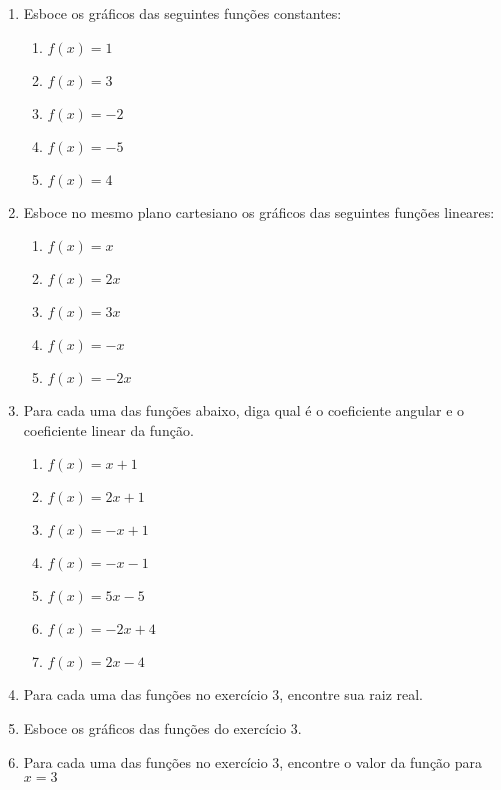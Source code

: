 \documentclass[a4paper]{article}
\begin{document}
\begin{enumerate}

\item Esboce os gráficos das seguintes funções constantes:

  \begin{enumerate}
  \item $f(x) = 1$
  \item $f(x) = 3$
  \item $f(x) = -2$
  \item $f(x) = -5$
  \item $f(x) = 4$
  \end{enumerate}

\item Esboce no mesmo plano cartesiano os gráficos das seguintes
  funções lineares:

  \begin{enumerate}
  \item $f(x) = x$
  \item $f(x) = 2x$
  \item $f(x) = 3x$
  \item $f(x) = -x$
  \item $f(x) = -2x$
  \end{enumerate}

\item Para cada uma das funções abaixo, diga qual é o coeficiente
  angular e o coeficiente linear da função.

  \begin{enumerate}
  \item $f(x) = x+1$
  \item $f(x) = 2x+1$
  \item $f(x) = -x+1$
  \item $f(x) = -x-1$
  \item $f(x) = 5x-5$
  \item $f(x) = -2x +4$
  \item $f(x) = 2x -4$
  \end{enumerate}

\item Para cada uma das funções no exercício 3, encontre sua raiz
  real.

\item Esboce os gráficos das funções do exercício 3.

\item Para cada uma das funções no exercício 3, encontre o valor da
  função para $x=3$


\end{enumerate}
\end{document}
